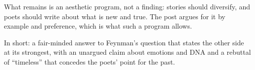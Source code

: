 \begin{afterword}
What remains is an aesthetic program, not a finding: stories should diversify, and poets should write about what is new and true. The post argues for it by example and preference, which is what such a program allows.

In short: a fair-minded answer to Feynman's question that states the other side at its strongest, with an unargued claim about emotions and DNA and a rebuttal of ``timeless'' that concedes the poets' point for the past.
\end{afterword}
